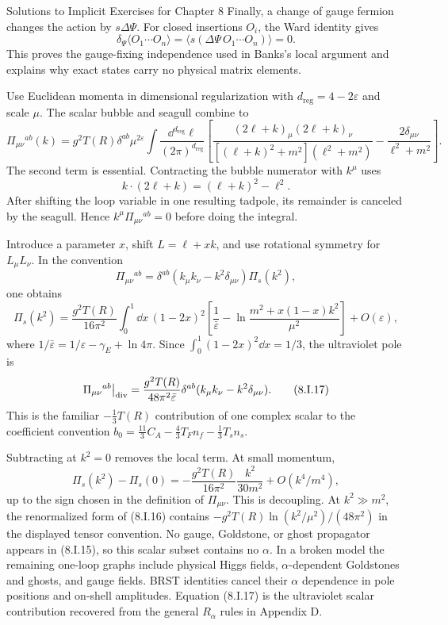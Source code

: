 \begin{bankssolutions}{Solutions to Implicit Exercises for Chapter 8}
Finally, a change of gauge fermion changes the action by $s\Delta\Psi$.
For closed insertions $O_i$, the Ward identity gives
\[
 \delta_\Psi\langle O_1\cdots O_n\rangle
 =\langle s(\Delta\Psi\,O_1\cdots O_n)\rangle=0.
\]
This proves the gauge-fixing independence used in Banks's local argument and
explains why exact states carry no physical matrix elements.

Use Euclidean momenta in dimensional regularization with
$d_{\mathrm{reg}}=4-2\varepsilon$ and scale $\mu$.  The scalar bubble and seagull combine
to
\[
 \Pi_{\mu\nu}{}^{ab}(k)=g^2T(R)\delta^{ab}\mu^{2\varepsilon}
 \int\frac{\dd^{d_{\mathrm{reg}}}\ell}{(2\pi)^{d_{\mathrm{reg}}}}
 \left[
 \frac{(2\ell+k)_\mu(2\ell+k)_\nu}
 {[(\ell+k)^2+m^2](\ell^2+m^2)}
 -\frac{2\delta_{\mu\nu}}{\ell^2+m^2}
 \right].
 \tag{8.I.15}
\]
The second term is essential.  Contracting the bubble numerator with $k^\mu$
uses
\[
 k\mathbin{\cdot}(2\ell+k)=(\ell+k)^2-\ell^2.
\]
After shifting the loop variable in one resulting tadpole, its remainder is
canceled by the seagull.  Hence $k^\mu\Pi_{\mu\nu}{}^{ab}=0$ before doing the
integral.

Introduce a parameter $x$, shift $L=\ell+xk$, and use rotational symmetry for
$L_\mu L_\nu$.  In the convention
\[
 \Pi_{\mu\nu}{}^{ab}=\delta^{ab}
 (k_\mu k_\nu-k^2\delta_{\mu\nu})\Pi_s(k^2),
\]
one obtains
\[
 \Pi_s(k^2)=\frac{g^2T(R)}{16\pi^2}
 \int_0^1\!\dd x\,(1-2x)^2
 \left[\frac1{\bar\varepsilon}
 -\ln\frac{m^2+x(1-x)k^2}{\mu^2}\right]+O(\varepsilon),
 \tag{8.I.16}
\]
where $1/\bar\varepsilon=1/\varepsilon-\gamma_E+\ln4\pi$.  Since
$\int_0^1(1-2x)^2\dd x=1/3$, the ultraviolet pole is
\[
 \Pi_{\mu\nu}{}^{ab}\big|_{\rm div}
 =\frac{g^2T(R)}{48\pi^2\bar\varepsilon}\delta^{ab}
 (k_\mu k_\nu-k^2\delta_{\mu\nu}).
 \tag{8.I.17}
\]
This is the familiar $-\tfrac13T(R)$ contribution of one complex scalar to
the coefficient convention
$b_0=\tfrac{11}{3}C_A-\tfrac43T_Fn_f-\tfrac13T_sn_s$.

Subtracting at $k^2=0$ removes the local term.  At small momentum,
\[
 \Pi_s(k^2)-\Pi_s(0)
 =-\frac{g^2T(R)}{16\pi^2}\frac{k^2}{30m^2}
 +O(k^4/m^4),
\]
up to the sign chosen in the definition of $\Pi_{\mu\nu}$.  This is
decoupling.  At $k^2\gg m^2$, the renormalized form of (8.I.16) contains
$-g^2T(R)\ln(k^2/\mu^2)/(48\pi^2)$ in the displayed tensor convention.  No
gauge, Goldstone, or ghost propagator appears in
(8.I.15), so this scalar subset contains no $\alpha$.  In a broken model the
remaining one-loop graphs include physical Higgs fields, $\alpha$-dependent
Goldstones and ghosts, and gauge fields.  BRST identities cancel their
$\alpha$ dependence in pole positions and on-shell amplitudes.  Equation
(8.I.17) is the ultraviolet scalar contribution recovered from the general
$R_\alpha$ rules in Appendix D.


\end{bankssolutions}
